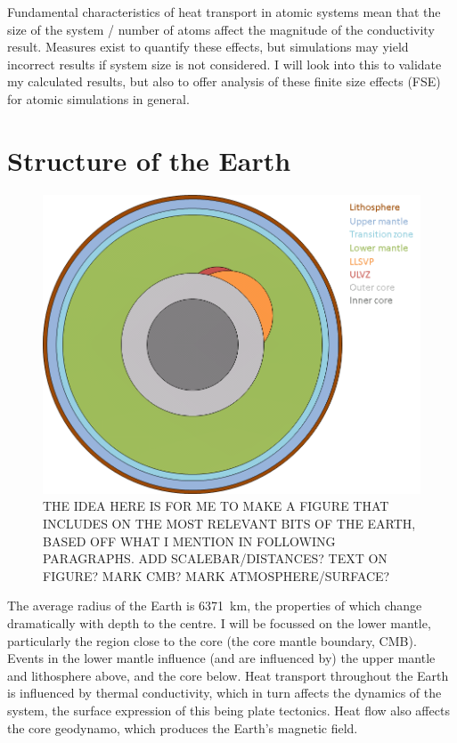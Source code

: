Fundamental characteristics of heat transport in atomic systems mean that the size of the system / number of atoms affect the magnitude of the conductivity result. Measures exist to quantify these effects, but simulations may yield incorrect results if system size is not considered. I will look into this to validate my calculated results, but also to offer analysis of these finite size effects (FSE) for atomic simulations in general.





\section{Structure of the Earth}
\label{sec:earth_structure}

\begin{figure}[h!]
  \includegraphics[width=\linewidth]{Figures/pp_earth_diagram.png}
  \caption[EARTH STRUCTURE DIAGRAM]{THE IDEA HERE IS FOR ME TO MAKE A FIGURE THAT INCLUDES ON THE MOST RELEVANT BITS OF THE EARTH, BASED OFF WHAT I MENTION IN FOLLOWING PARAGRAPHS. ADD SCALEBAR/DISTANCES? TEXT ON FIGURE? MARK CMB? MARK ATMOSPHERE/SURFACE?}
  \label{fig:earth_diagram}
\end{figure}

The average radius of the Earth is 6371~km, the properties of which change dramatically with depth to the centre. I will be focussed on the lower mantle, particularly the region close to the core (the core mantle boundary, CMB). Events in the lower mantle influence (and are influenced by) the upper mantle and lithosphere above, and the core below. Heat transport throughout the Earth is influenced by thermal conductivity, which in turn affects the dynamics of the system, the surface expression of this being plate tectonics. Heat flow also affects the core geodynamo, which produces the Earth's magnetic field. 

